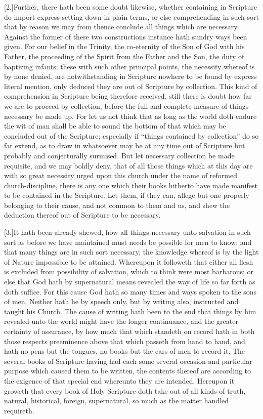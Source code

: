 [2.]Further, there hath been some doubt likewise, whether containing in Scripture do import express setting down in plain terms, or else comprehending in such sort that by reason we may from thence conclude all things which are necessary. Against the former of these two constructions instance hath sundry ways been given. For our belief in the Trinity, the co-eternity of the Son of God with his Father, the proceeding of the Spirit from the Father and the Son, the duty of baptizing infants: these with such  other principal points, the necessity whereof is by none denied, are notwithstanding in Scripture nowhere to be found by express literal mention, only deduced they are out of Scripture by collection. This kind of comprehension in Scripture being therefore received, still there is doubt how far we are to proceed by collection, before the full and complete measure of things necessary be made up. For let us not think that as long as the world doth endure the wit of man shall be able to sound the bottom of that which may be concluded out of the Scripture; especially if “things contained by collection” do so far extend, as to draw in whatsoever may be at any time out of Scripture but probably and conjecturally surmised. But let necessary collection be made requisite, and we may boldly deny, that of all those things which at this day are with so great necessity urged upon this church under the name of reformed church-discipline, there is any one which their books hitherto have made manifest to be contained in the Scripture. Let them, if they can, allege but one properly belonging to their cause, and not common to them and us, and shew the deduction thereof out of Scripture to be necessary.

[3.]It hath been already shewed, how all things necessary unto salvation in such sort as before we have maintained must needs be possible for men to know; and that many things are in such sort necessary, the knowledge whereof is by the light of Nature impossible to be attained. Whereupon it followeth that either all flesh is excluded from possibility of salvation, which to think were most barbarous; or else that God hath by supernatural means revealed the way of life so far forth as doth suffice. For this cause God hath so many times and ways spoken to the sons of men. Neither hath he by speech only, but by writing also, instructed and taught his Church. The cause of writing hath been to the end that things by him revealed unto the world might have the longer continuance, and the greater certainty of assurance, by how much that which standeth on record hath in both those respects preeminence above that which passeth from hand to hand, and hath no pens but the tongues, no books but the ears of men to record it. The several books of Scripture having had each some several occasion and particular purpose which  caused them to be written, the contents thereof are according to the exigence of that special end whereunto they are intended. Hereupon it groweth that every book of Holy Scripture doth take out of all kinds of truth, natural, historical, foreign, supernatural, so much as the matter handled requireth.

